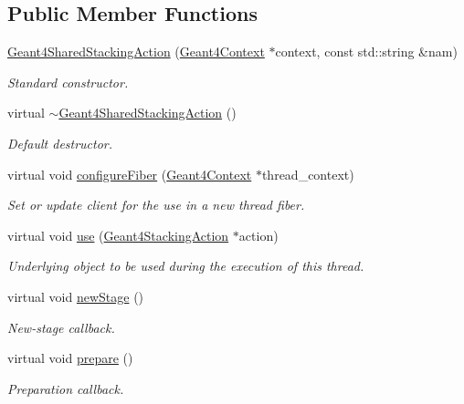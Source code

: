 \subsection*{Public Member Functions}
\begin{DoxyCompactItemize}
\item 
\hyperlink{class_d_d4hep_1_1_simulation_1_1_geant4_shared_stacking_action_a555935d842ff0a023c1bf80592ad086e}{Geant4SharedStackingAction} (\hyperlink{class_d_d4hep_1_1_simulation_1_1_geant4_context}{Geant4Context} $\ast$context, const std::string \&nam)
\begin{DoxyCompactList}\small\item\em Standard constructor. \item\end{DoxyCompactList}\item 
virtual \hyperlink{class_d_d4hep_1_1_simulation_1_1_geant4_shared_stacking_action_a0cfbf0ceed945aff6b837df8fd5459c7}{$\sim$Geant4SharedStackingAction} ()
\begin{DoxyCompactList}\small\item\em Default destructor. \item\end{DoxyCompactList}\item 
virtual void \hyperlink{class_d_d4hep_1_1_simulation_1_1_geant4_shared_stacking_action_af204c8b8ed06b5ac14c168ea639c51ac}{configureFiber} (\hyperlink{class_d_d4hep_1_1_simulation_1_1_geant4_context}{Geant4Context} $\ast$thread\_\-context)
\begin{DoxyCompactList}\small\item\em Set or update client for the use in a new thread fiber. \item\end{DoxyCompactList}\item 
virtual void \hyperlink{class_d_d4hep_1_1_simulation_1_1_geant4_shared_stacking_action_a8201cb5679ace2713e6a34ebe1282dbf}{use} (\hyperlink{class_d_d4hep_1_1_simulation_1_1_geant4_stacking_action}{Geant4StackingAction} $\ast$action)
\begin{DoxyCompactList}\small\item\em Underlying object to be used during the execution of this thread. \item\end{DoxyCompactList}\item 
virtual void \hyperlink{class_d_d4hep_1_1_simulation_1_1_geant4_shared_stacking_action_af92666552c404908a7e99c8145846c5f}{newStage} ()
\begin{DoxyCompactList}\small\item\em New-\/stage callback. \item\end{DoxyCompactList}\item 
virtual void \hyperlink{class_d_d4hep_1_1_simulation_1_1_geant4_shared_stacking_action_a22e3516dfed160da7a3b246d28098891}{prepare} ()
\begin{DoxyCompactList}\small\item\em Preparation callback. \item\end{DoxyCompactList}\end{DoxyCompactItemize}
